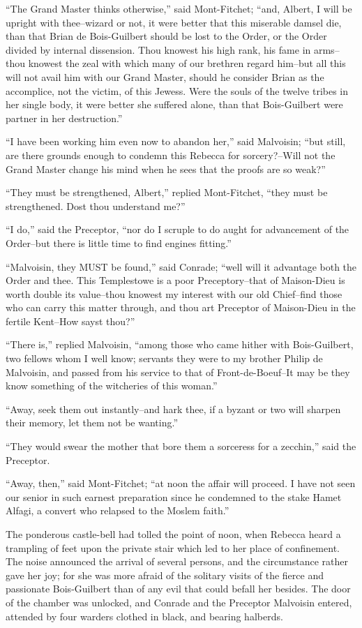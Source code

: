 ``The Grand Master thinks otherwise,'' said Mont-Fitchet; ``and, Albert,
I will be upright with thee--wizard or not, it were better that this
miserable damsel die, than that Brian de Bois-Guilbert should be lost to
the Order, or the Order divided by internal dissension. Thou knowest his
high rank, his fame in arms--thou knowest the zeal with which many of
our brethren regard him--but all this will not avail him with our Grand
Master, should he consider Brian as the accomplice, not the victim, of
this Jewess. Were the souls of the twelve tribes in her single body, it
were better she suffered alone, than that Bois-Guilbert were partner in
her destruction.''

``I have been working him even now to abandon her,'' said Malvoisin;
``but still, are there grounds enough to condemn this Rebecca for
sorcery?--Will not the Grand Master change his mind when he sees that
the proofs are so weak?''

``They must be strengthened, Albert,'' replied Mont-Fitchet, ``they must
be strengthened. Dost thou understand me?''

``I do,'' said the Preceptor, ``nor do I scruple to do aught for
advancement of the Order--but there is little time to find engines
fitting.''

``Malvoisin, they MUST be found,'' said Conrade; ``well will it
advantage both the Order and thee. This Templestowe is a poor
Preceptory--that of Maison-Dieu is worth double its value--thou knowest
my interest with our old Chief--find those who can carry this matter
through, and thou art Preceptor of Maison-Dieu in the fertile Kent--How
sayst thou?''

``There is,'' replied Malvoisin, ``among those who came hither with
Bois-Guilbert, two fellows whom I well know; servants they were to my
brother Philip de Malvoisin, and passed from his service to that of
Front-de-Boeuf--It may be they know something of the witcheries of this
woman.''

``Away, seek them out instantly--and hark thee, if a byzant or two will
sharpen their memory, let them not be wanting.''

``They would swear the mother that bore them a sorceress for a
zecchin,'' said the Preceptor.

``Away, then,'' said Mont-Fitchet; ``at noon the affair will proceed. I
have not seen our senior in such earnest preparation since he condemned
to the stake Hamet Alfagi, a convert who relapsed to the Moslem faith.''

The ponderous castle-bell had tolled the point of noon, when Rebecca
heard a trampling of feet upon the private stair which led to her place
of confinement. The noise announced the arrival of several persons, and
the circumstance rather gave her joy; for she was more afraid of the
solitary visits of the fierce and passionate Bois-Guilbert than of any
evil that could befall her besides. The door of the chamber was
unlocked, and Conrade and the Preceptor Malvoisin entered, attended by
four warders clothed in black, and bearing halberds.

